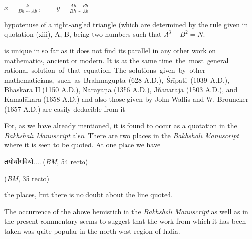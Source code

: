 \documentclass[10pt, openany]{book}
\begin{document}
\hspace{6mm} $x = \frac{k}{Bh \sim Ab}$\,, ~~~~$y = \frac{Ah-Bb}{Bh \sim Ab}$

\vspace{0.3cm} 
{hypotenuse of a right-angled triangle (which are determined}
{by the rule given in quotation (xiii), A, B, being two numbers}
{such that $A^3 - B^2 = N.$}

\vspace{0.3cm}{This form of solution of $Nx^2 + 1 = y^2$}
{is unique in so far as}
{it does not find its parallel in any other work on mathematics,}
{ancient or modern. It is at the same time \,the \,most \,general \,rational \,solution \,of \,that \,equation. The \,solutions \,given \,by \,other \,mathematicians, \,such \,as \,Brahmagupta \,(628 A.D.), \,Śrīpati \,(1039 \,A.D.), Bhāskara II (1150 A.D.), Nārāyaṇa (1356}
{A.D.), Jñānarāja (1503 A.D.), and Kamalākara (1658 A.D.)}
{and also those given by John Wallis and W. Brouncker (1657}
{A.D.) are easily deducible from it.}

\vspace{0.3cm}{The hemistich of quotation (vii) is also of great interest.}
{For, as we have already mentioned, it is found to occur as a}
{quotation in the \textit{Bakhshālī Manuscript} also. There are two}
{places in the \textit{Bakhshālī Manuscript }where it is seen to be quoted.}
{At one place we have}

\vspace{0.3cm} \hspace{25mm} {\qt तयोर्योगवियो....} \englishfont \hfill (\textit{BM}, 54 recto)

\newpage

\justify {}
\vspace{3mm}

\hspace{4mm}{\qt कस्मात् कारणात् तयोर्योगवियोगस्यावियोगस....} \englishfont \hfill (\textit{BM}, 35 recto)

\justify\englishfont{}
{the places, but there is no doubt about the line quoted.}
\vspace{3mm}

{The occurrence of the above hemistich in the \textit{Bakhshālī}}
\textit{Manuscript}{ as well as in the present commentary seems to}
{suggest that the work from which it has been taken was quite}
{popular in the north-west region of India.}
\vspace{3mm}
\end{document}
